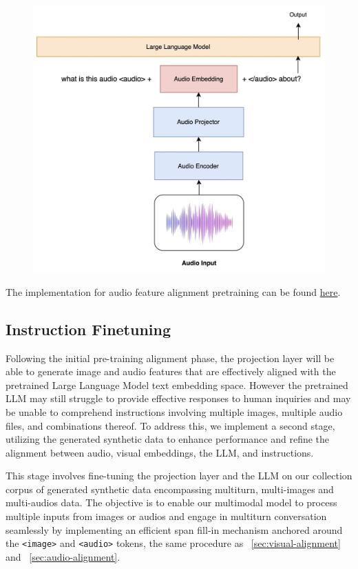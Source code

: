 \documentclass[preprint]{article}
\begin{document}
\begin{figure}[hbt!]
  \centering
  \includegraphics[width=0.6\linewidth]{pic/audio.jpg} %
\end{figure}

The implementation for audio feature alignment pretraining can be found \href{https://github.com/mesolitica/multimodal-LLM/tree/master/audio-only}{here}.

\subsection{Instruction Finetuning}

Following the initial pre-training alignment phase, the projection layer will be able to generate image and audio features that are effectively aligned with the pretrained Large Language Model text embedding space. However the pretrained LLM may still struggle to provide effective responses to human inquiries and may be unable to comprehend instructions involving multiple images, multiple audio files, and combinations thereof. To address this, we implement a second stage, utilizing the generated synthetic data to enhance performance and refine the alignment between audio, visual embeddings, the LLM, and instructions.

This stage involves fine-tuning the projection layer and the LLM on our collection corpus of generated synthetic data encompassing multiturn, multi-images and multi-audios data. The objective is to enable our multimodal model to process multiple inputs from images or audios and engage in multiturn conversation seamlessly by implementing an efficient span fill-in mechanism anchored around the \texttt{<image>} and \texttt{<audio>} tokens, the same procedure as ~\ref{sec:visual-alignment} and ~\ref{sec:audio-alignment}.
\end{document}
